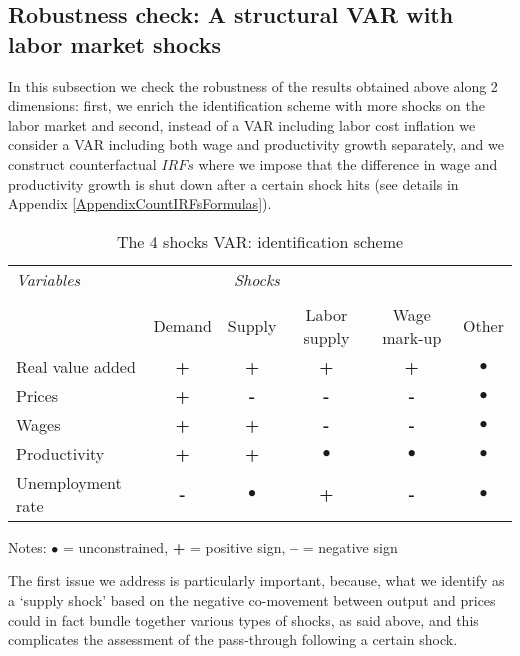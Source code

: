 \documentclass[11pt]{article}
\begin{document}
\subsection{Robustness check: A structural VAR with  labor market shocks}

In this subsection we check the robustness of the results obtained above along 2 dimensions: first, we enrich the identification scheme with more shocks on the labor market and second, instead of a VAR including labor cost inflation we consider a VAR including both wage and productivity growth separately, and we construct counterfactual $IRFs$ where we impose that the difference in wage and productivity growth is shut down after a certain shock hits (see details in Appendix \ref{AppendixCountIRFsFormulas}). 
\begin{table}
\begin{center}
\caption{The 4 shocks VAR: identification scheme}
\vskip 0.5cm
\label{tab: identification4shock}
\begin{tabular}{lccccc}
\toprule
\textit{Variables} & \multicolumn{3}{c}{\textit{Shocks}} \\ \\[-1ex]
& Demand   & Supply & Labor supply & Wage mark-up & Other \\

Real value added & \textbf{+} & \textbf{+} & \textbf{+} & \textbf{+} & $\bullet$ \\
Prices & \textbf{+} & \textbf{-} & \textbf{-} & \textbf{-} & $\bullet$ \\
Wages & \textbf{+} & \textbf{+} & \textbf{-} & \textbf{-} & $\bullet$ \\
Productivity & \textbf{+} & \textbf{+} & $\bullet$ & $\bullet$ & $\bullet$ \\
Unemployment rate & \textbf{-} & $\bullet$ & \textbf{+} & \textbf{-} & $\bullet$ \\
\end{tabular}
\end{center}
\par
{\small \begin{center}Notes: $\bullet$ = unconstrained, \textbf{+} = positive sign,
\textbf{--} = negative sign \end{center}}
\end{table}

The first issue we address is particularly important, because, what we identify as a `supply shock' based on the negative co-movement between output and prices could in fact bundle together various types of shocks, as said above, and this complicates the assessment of the pass-through following a certain shock.
\end{document}
